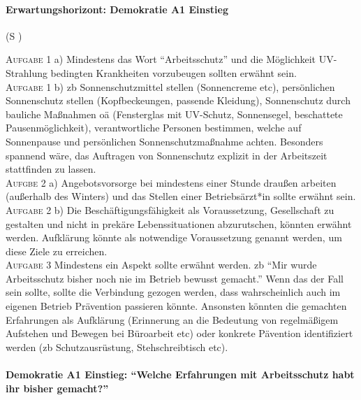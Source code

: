 \paragraph{Erwartungshorizont: Demokratie A1 Einstieg} (\gls{S} \pageref{DEMOKRATIE-A1})

\textsc{Aufgabe 1} a) \quad
Mindestens das Wort \enquote{Arbeitsschutz} und die Möglichkeit UV-Strahlung bedingten Krankheiten vorzubeugen sollten erwähnt sein. 
\\

\textsc{Aufgabe 1} b) \quad
\Gls{zb} Sonnenschutzmittel stellen (Sonnencreme \gls{etc}), persönlichen Sonnenschutz stellen (Kopfbeckeungen, passende Kleidung), Sonnenschutz durch bauliche Maßnahmen \gls{oä} (Fensterglas mit UV-Schutz, Sonnensegel, beschattete Pausenmöglichkeit), verantwortliche Personen bestimmen, welche auf Sonnenpause und persönlichen Sonnenschutzmaßnahme achten. 
Besonders spannend wäre, das Auftragen von Sonnenschutz explizit in der Arbeitszeit stattfinden zu lassen. 
\\

\textsc{Aufgbe 2} a) \quad
Angebotsvorsorge bei mindestens einer Stunde draußen arbeiten (außerhalb des Winters) und das Stellen einer Betriebsärzt*in sollte erwähnt sein. 
\\

\textsc{Aufgabe 2} b) \quad
Die Beschäftigungsfähigkeit als Voraussetzung, Gesellschaft zu gestalten und nicht in prekäre Lebenssituationen abzurutschen, könnten erwähnt werden. 
Aufklärung könnte als notwendige Voraussetzung genannt werden, um diese Ziele zu erreichen.
\\

\textsc{Aufgabe 3} \quad
Mindestens ein Aspekt sollte erwähnt werden. \Gls{zb} \enquote{Mir wurde Arbeitsschutz bisher noch nie im Betrieb bewusst gemacht.}
Wenn das der Fall sein sollte, sollte die Verbindung gezogen werden, dass wahrscheinlich auch im eigenen Betrieb Prävention passieren könnte. 
Ansonsten könnten die gemachten Erfahrungen als Aufklärung (Erinnerung an die Bedeutung von regelmäßigem Aufstehen und Bewegen bei Büroarbeit \gls{etc}) oder konkrete Pävention identifiziert werden (\gls{zb} Schutzausrüstung, Stehschreibtisch \gls{etc}).



\paragraph{Demokratie A1 Einstieg: \enquote{Welche Erfahrungen mit Arbeitsschutz habt ihr bisher gemacht?} \label{DemokratieA1}} 

